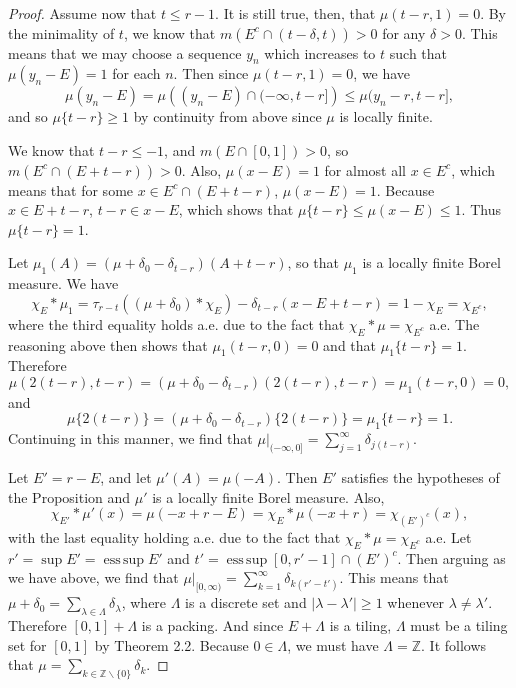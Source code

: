 \documentclass{amsart}
\DeclareMathOperator{\esssup}{ess\,sup}
\begin{document}
\begin{proof}
    Assume now that $t\leq r-1$. It is still true, then, that $\mu(t-r,1)=0$. By the minimality of $t$, we know that $m(E^c\cap (t-\delta,t))>0$ for any $\delta>0$. This means that we may choose a sequence $y_n$ which increases to $t$ such that $\mu(y_n-E)=1$ for each $n$. Then since $\mu(t-r,1)=0$, we have
    $$\mu(y_n-E)=\mu\left((y_n-E)\cap(-\infty,t-r]\right)\leq \mu(y_n-r,t-r],$$
    and so $\mu\{t-r\}\ge 1$ by continuity from above since $\mu$ is locally finite. 
    
    We know that $t-r\leq -1$, and $m(E\cap[0,1])>0$, so $m(E^c\cap(E+t-r))>0$. Also, $\mu(x-E)=1$ for almost all $x\in E^c$, which means that for some $x\in E^c\cap(E+t-r)$, $\mu(x-E)=1$. Because $x\in E+t-r$, $t-r\in x-E$, which shows that $\mu\{t-r\}\leq\mu(x-E)\leq 1$. Thus $\mu\{t-r\}=1$.

    Let $\mu_1(A)=(\mu+\delta_0-\delta_{t-r})(A+t-r)$, so that $\mu_1$ is a locally finite Borel measure. We have
    $$\chi_E*\mu_1=\tau_{r-t}((\mu+\delta_0)*\chi_E)-\delta_{t-r}(x-E+t-r)=1-\chi_E=\chi_{E^c},$$
    where the third equality holds a.e. due to the fact that $\chi_E*\mu=\chi_{E^c}$ a.e. The reasoning above then shows that $\mu_1(t-r,0)=0$ and that $\mu_1\{t-r\}=1$. Therefore
    $$\mu(2(t-r),t-r)=(\mu+\delta_0-\delta_{t-r})(2(t-r),t-r)=\mu_1(t-r,0)=0,$$
    and
    $$\mu\{2(t-r)\}=(\mu+\delta_0-\delta_{t-r})\{2(t-r)\}=\mu_1\{t-r\}=1.$$
    Continuing in this manner, we find that $\mu|_{(-\infty,0]}=\sum_{j=1}^\infty \delta_{j(t-r)}$. 
    
    Let $E'=r-E$, and let $\mu'(A)=\mu(-A)$. Then $E'$ satisfies the hypotheses of the Proposition and $\mu'$ is a locally finite Borel measure. Also,
    $$\chi_{E'}*\mu'(x)=\mu(-x+r-E)=\chi_E*\mu(-x+r)=\chi_{(E')^c}(x),$$
    with the last equality holding a.e. due to the fact that $\chi_E*\mu=\chi_{E^c}$ a.e. Let $r'=\sup E'=\esssup E'$ and $t'=\esssup[0,r'-1]\cap (E')^c$. Then arguing as we have above, we find that $\mu|_{[0,\infty)}=\sum_{k=1}^\infty \delta_{k(r'-t')}$. This means that $\mu+\delta_0=\sum_{\lambda\in \Lambda}\delta_\lambda$, where $\Lambda$ is a discrete set and $|\lambda-\lambda'|\ge 1$ whenever $\lambda\neq\lambda'$. Therefore $[0,1]+\Lambda$ is a packing. And since $E+\Lambda$ is a tiling, $\Lambda$ must be a tiling set for $[0,1]$ by Theorem 2.2. Because $0\in\Lambda$, we must have $\Lambda=\mathbb{Z}$. It follows that $\mu=\sum_{k\in\mathbb{Z}\smallsetminus\{0\}}\delta_k$. \end{proof}


\end{document}
